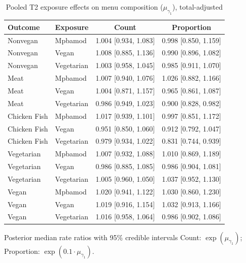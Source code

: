 \begin{table}[H]
\centering
\caption{Pooled T2 exposure effects on menu composition ($\mu_{\gamma_1}$), total-adjusted}
\label{tab:a1_t2_mu_gamma_adj}
\begin{tabular}{llcc}
\toprule
Outcome & Exposure & Count & Proportion \\
\midrule
Nonvegan & Mpbamod & 1.004 [0.934, 1.083] & 0.998 [0.850, 1.159] \\
Nonvegan & Vegan & 1.008 [0.885, 1.136] & 0.990 [0.896, 1.082] \\
Nonvegan & Vegetarian & 1.003 [0.958, 1.045] & 0.985 [0.911, 1.070] \\
Meat & Mpbamod & 1.007 [0.940, 1.076] & 1.026 [0.882, 1.166] \\
Meat & Vegan & 1.004 [0.871, 1.157] & 0.965 [0.861, 1.087] \\
Meat & Vegetarian & 0.986 [0.949, 1.023] & 0.900 [0.828, 0.982] \\
Chicken Fish & Mpbamod & 1.017 [0.939, 1.101] & 0.997 [0.851, 1.172] \\
Chicken Fish & Vegan & 0.951 [0.850, 1.060] & 0.912 [0.792, 1.047] \\
Chicken Fish & Vegetarian & 0.979 [0.934, 1.022] & 0.831 [0.744, 0.939] \\
Vegetarian & Mpbamod & 1.007 [0.932, 1.088] & 1.010 [0.869, 1.189] \\
Vegetarian & Vegan & 0.986 [0.885, 1.085] & 0.986 [0.904, 1.081] \\
Vegetarian & Vegetarian & 1.005 [0.960, 1.050] & 1.037 [0.952, 1.130] \\
Vegan & Mpbamod & 1.020 [0.941, 1.122] & 1.030 [0.860, 1.230] \\
Vegan & Vegan & 1.019 [0.916, 1.154] & 1.032 [0.913, 1.166] \\
Vegan & Vegetarian & 1.016 [0.958, 1.064] & 0.986 [0.902, 1.086] \\
\bottomrule
\end{tabular}
\par\smallskip\footnotesize Posterior median rate ratios with 95\% credible intervals Count: $\exp(\mu_{\gamma_1})$; Proportion: $\exp(0.1 \cdot \mu_{\gamma_1})$.
\end{table}
